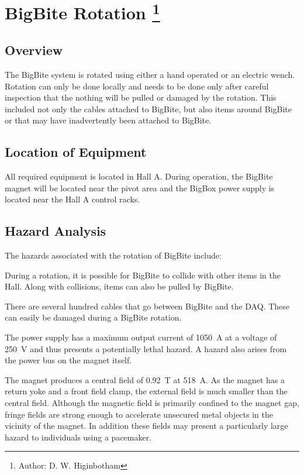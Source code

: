 %
%

\chapter[BigBite Magnet]{BigBite Rotation 
\footnote{Author: D. W. Higinbotham }
}

\section{Overview}
The BigBite system is rotated using either a hand operated or an electric wench.
Rotation can only be done locally and needs to be done only after careful inspection that
the nothing will be pulled or damaged by the rotation.  This included not only the cables
attached to BigBite, but also items around BigBite or that may have inadvertently been attached 
to BigBite.


\section{Location of Equipment}

All required equipment is located in Hall A.  During operation, the BigBite magnet 
will be located near the pivot area and the BigBox power supply is
located near the Hall A control racks.

\section{Hazard Analysis}

The hazards associated with the rotation of BigBite include:

During a rotation, it is possible for BigBite to collide with other items in the Hall.
Along with collisions, items can also be pulled by BigBite.

There are several hundred cables that go between BigBite and the DAQ.  These can easily
be damaged during a BigBite rotation.

	The power supply has a maximum output current of 1050~A 
at a voltage of 250~V and thus presents a potentially lethal hazard.  
A hazard also arises from the power bus on the magnet itself. 

	The magnet produces a central field of 0.92~T at 518~A.  
As the magnet has a return yoke and a front field clamp, the external field is much smaller 
than the central field.   Although the magnetic field is primarily confined to the magnet 
gap, fringe fields are strong enough to accelerate unsecured metal objects in the vicinity of
the magnet.  In addition these fields may present a particularly large hazard 
to individuals using a pacemaker.

